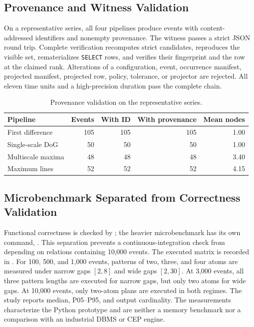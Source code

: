 \documentclass[11pt,a4paper]{article}
\newcommand{\code}[1]{\texttt{#1}}
\begin{document}
\subsection{Provenance and Witness Validation}

On a representative series, all four pipelines produce events with content-addressed identifiers and nonempty provenance. The witness passes a strict JSON round trip. Complete verification recomputes strict candidates, reproduces the visible set, rematerializes \code{SELECT} rows, and verifies their fingerprint and the row at the claimed rank. Alterations of a configuration, event, occurrence manifest, projected manifest, projected row, policy, tolerance, or projector are rejected. All eleven time units and a high-precision duration pass the complete chain.

\begin{table}[H]
\centering
\caption{Provenance validation on the representative series.}
\label{tab:provenance-validation}
\small
\begin{tabular}{lrrrr}
\toprule
Pipeline & Events & With ID & With provenance & Mean nodes \\
\midrule
First difference & 105 & 105 & 105 & 1.00 \\
Single-scale DoG & 50 & 50 & 50 & 1.00 \\
Multiscale maxima & 48 & 48 & 48 & 3.40 \\
Maximum lines & 52 & 52 & 52 & 4.15 \\
\bottomrule
\end{tabular}
\end{table}

\subsection{Microbenchmark Separated from Correctness Validation}

Functional correctness is checked by ; the heavier microbenchmark has its own command, . This separation prevents a continuous-integration check from depending on relations containing 10,000 events. The executed matrix is recorded in . For 100, 500, and 1,000 events, patterns of two, three, and four atoms are measured under narrow gaps $[2,8]$ and wide gaps $[2,30]$. At 3,000 events, all three pattern lengths are executed for narrow gaps, but only two atoms for wide gaps. At 10,000 events, only two-atom plans are executed in both regimes. The study reports median, P05--P95, and output cardinality. The measurements characterize the Python prototype and are neither a memory benchmark nor a comparison with an industrial DBMS or CEP engine.
\end{document}
